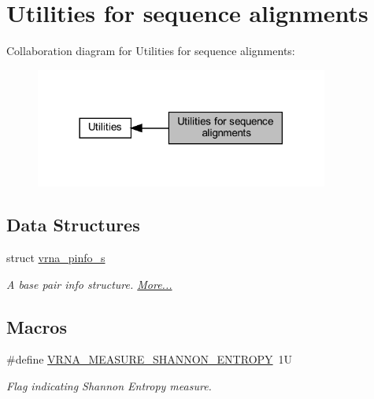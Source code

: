 \hypertarget{group__aln__utils}{}\section{Utilities for sequence alignments}
\label{group__aln__utils}
Collaboration diagram for Utilities for sequence alignments\+:
\nopagebreak
\begin{figure}[H]
\begin{center}
\leavevmode
\includegraphics[width=273pt]{group__aln__utils}
\end{center}
\end{figure}
\subsection*{Data Structures}
\begin{DoxyCompactItemize}
\item 
struct \hyperlink{group__aln__utils_structvrna__pinfo__s}{vrna\+\_\+pinfo\+\_\+s}
\begin{DoxyCompactList}\small\item\em A base pair info structure.  \hyperlink{group__aln__utils_structvrna__pinfo__s}{More...}\end{DoxyCompactList}\end{DoxyCompactItemize}
\subsection*{Macros}
\begin{DoxyCompactItemize}
\item 
\#define \hyperlink{group__aln__utils_ga1e659227c9fc077d29989f576f129000}{V\+R\+N\+A\+\_\+\+M\+E\+A\+S\+U\+R\+E\+\_\+\+S\+H\+A\+N\+N\+O\+N\+\_\+\+E\+N\+T\+R\+O\+PY}~1U
\begin{DoxyCompactList}\small\item\em Flag indicating Shannon Entropy measure. \end{DoxyCompactList}\end{DoxyCompactItemize}
